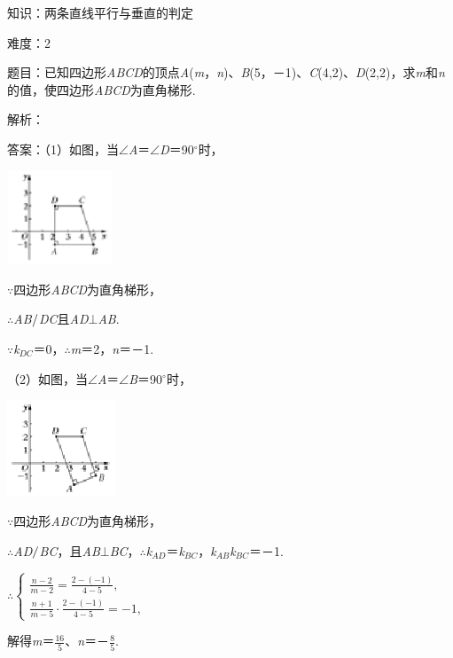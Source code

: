 \documentclass{article} %
\begin{document}
知识：两条直线平行与垂直的判定

难度：2

题目：已知四边形\textit{ABCD}的顶点\textit{A}(\textit{m}，\textit{n})、\textit{B}(5，－1)、\textit{C}(4,2)、\textit{D}(2,2)，求\textit{m}和\textit{n}的值，使四边形\textit{ABCD}为直角梯形.

解析：

答案：（1）如图，当$\mathrm{\angle}$\textit{A}＝$\mathrm{\angle}$\textit{D}＝90$\mathrm{{}^\circ}$时，

\includegraphics*[width=1.25in, height=1.10in, keepaspectratio=false]{image273}

$\mathrm{\because}$四边形\textit{ABCD}为直角梯形，

$\mathrm{\therefore}$\textit{AB}$\mathrm{\//}$\textit{DC}且\textit{AD}$\mathrm{\bot}$\textit{AB}.

$\mathrm{\because}$\textit{k${}_{DC}$}＝0，$\mathrm{\therefore}$\textit{m}＝2，\textit{n}＝－1.

（2）如图，当$\mathrm{\angle}$\textit{A}＝$\mathrm{\angle}$\textit{B}＝90$\mathrm{{}^\circ}$时，

\includegraphics*[width=1.27in, height=1.13in, keepaspectratio=false]{image274}

$\mathrm{\because}$四边形\textit{ABCD}为直角梯形，

$\mathrm{\therefore}$\textit{AD}$\mathrm{\//}$\textit{BC}，且\textit{AB}$\mathrm{\bot}$\textit{BC}，$\mathrm{\therefore}$\textit{k${}_{AD}$}＝\textit{k${}_{BC}$}，\textit{k${}_{AB}$k${}_{BC}$}＝－1.

$\mathrm{\therefore}\left\{\begin{array}{l} \frac{n-2}{m-2}=\frac{2-(-1)}{4-5},\\ \frac{n+1}{m-5}\cdot\frac{2-(-1)}{4-5}=-1, \end{array}\right.$

解得\textit{m}＝$\frac{16}{5}$、\textit{n}＝－$\frac{8}{5}$.
\end{document}
